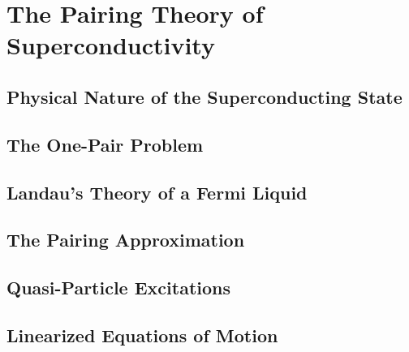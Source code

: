 \chapter{The Pairing Theory of Superconductivity} %
\label{cha:The Pairing Theory of Superconductivity}
\section{Physical Nature of the Superconducting State} %
\label{sec:Physical Nature of the Superconducting State}


\section{The One-Pair Problem} %
\label{sec:The One-Pair Problem}


\section{Landau's Theory of a Fermi Liquid} %
\label{sec:Landau's Theory of a Fermi Liquid}


\section{The Pairing Approximation} %
\label{sec:The Pairing Approximation}


\section{Quasi-Particle Excitations} %
\label{sec:Quasi-Particle Excitations}


\section{Linearized Equations of Motion} %
\label{sec:Linearized Equations of Motion}

